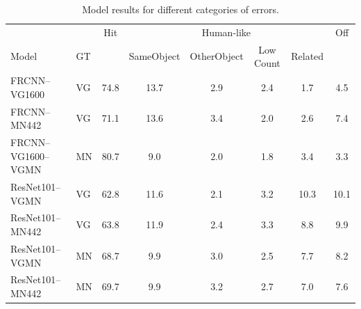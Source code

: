 \begin{table}[t]
	\centering
	\small
	\begin{tabular}{ll||c|cccc|c}
		\toprule
		&  & Hit & \multicolumn{4}{c|}{Human-like} & Off \\
		Model &  GT &  & SameObject &  OtherObject &  Low Count &  Related &   \\
		\midrule
		FRCNN--VG1600&VG &         74.8 &                13.7 &                  2.9 &              2.4 &              1.7 &          4.5 \\
		FRCNN--MN442&VG &         71.1 &                13.6 &                  3.4 &              2.0 &              2.6 &          7.4 \\
		\midrule
		FRCNN--VG1600--VGMN&MN &         80.7 &                 9.0 &                  2.0 &              1.8 &              3.4 &          3.3 \\
		\midrule
		ResNet101--VGMN&VG &         62.8 &                11.6 &                  2.1 &              3.2 &             10.3 &         10.1 \\
		ResNet101--MN442&VG &         63.8 &                11.9 &                  2.4 &              3.3 &              8.8 &          9.9 \\
		ResNet101--VGMN&MN &         68.7 &                 9.9 &                  3.0 &              2.5 &              7.7 &          8.2 \\
		ResNet101--MN442&MN &         69.7 &                 9.9 &                  3.2 &              2.7 &              7.0 &          7.6 \\	
		\bottomrule
	\end{tabular}
	\caption{Model results for different categories of errors. \label{tab:humanlike}}
\end{table}

